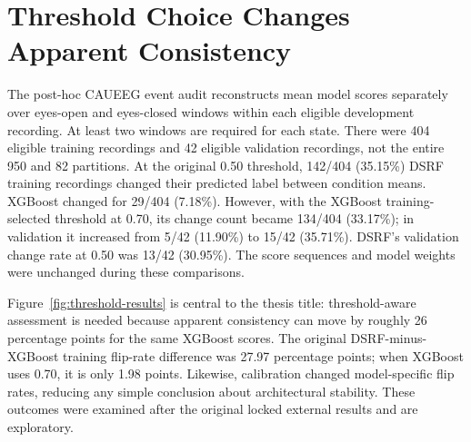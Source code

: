 
\section{Threshold Choice Changes Apparent Consistency}
The post-hoc CAUEEG event audit reconstructs mean model scores separately over eyes-open and eyes-closed windows within each eligible development recording. At least two windows are required for each state. There were 404 eligible training recordings and 42 eligible validation recordings, not the entire 950 and 82 partitions. At the original 0.50 threshold, 142/404 (35.15\%) DSRF training recordings changed their predicted label between condition means. XGBoost changed for 29/404 (7.18\%). However, with the XGBoost training-selected threshold at 0.70, its change count became 134/404 (33.17\%); in validation it increased from 5/42 (11.90\%) to 15/42 (35.71\%). DSRF's validation change rate at 0.50 was 13/42 (30.95\%). The score sequences and model weights were unchanged during these comparisons.


Figure~\ref{fig:threshold-results} is central to the thesis title: threshold-aware assessment is needed because apparent consistency can move by roughly 26 percentage points for the same XGBoost scores. The original DSRF-minus-XGBoost training flip-rate difference was 27.97 percentage points; when XGBoost uses 0.70, it is only 1.98 points. Likewise, calibration changed model-specific flip rates, reducing any simple conclusion about architectural stability. These outcomes were examined after the original locked external results and are exploratory.

